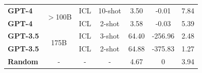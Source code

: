\begin{center}
\begin{table}[!htbp]
\begin{center}
\begin{adjustbox}{max width=\textwidth}
\begin{tabular}{lcccccc}
\textbf{GPT-4} &\multirow{2}{*}{$>$100B\footnotemark[2]} & ICL & 10-shot & 3.50 & -0.01 & 7.84\\
\textbf{GPT-4}& & ICL & 2-shot & 3.58 & -0.03 & 5.39\\\hline
\textbf{GPT-3.5}& \multirow{2}{*}{175B} & ICL & 3-shot & 64.40 & -256.96 & 2.48\\
\textbf{GPT-3.5} & & ICL & 2-shot & 64.88 & -375.83 & 1.27\\\hline
\textbf{Random} & - & - & - & 4.67 & 0 & 3.94 \\\hline
\bottomrule[1.5pt]
\end{tabular}
\end{adjustbox}
\end{center}

\end{table}
\end{center}
